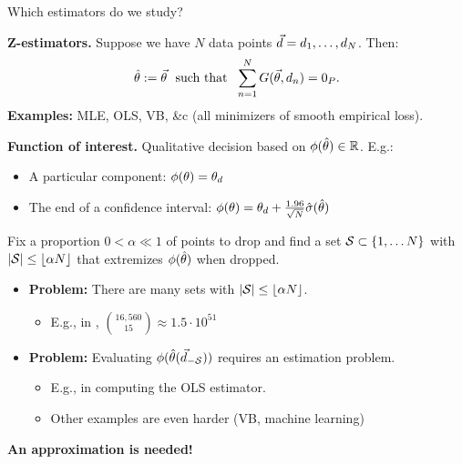 


\begin{frame}[t]{Which estimators do we study?}

\textbf{Z-estimators.  }
Suppose we have $N$ data points $\vec{d} = d_{1}, \ldots, d_{N}$.  Then:
%
\begin{align*}
%
\thetahat :=
\thetavec \,\, \textrm{ such that } \,\,
\sumn
G(\thetavec, \d_{n}) =  \zP .
%
\end{align*}
%
%
\textbf{Examples:} MLE, OLS, VB, \&c (all minimizers of smooth empirical loss).

\hrulefill

\textbf{Function of interest.  }Qualitative decision
based on $\phi(\hat{\theta}) \in \mathbb{R}$.  E.g.:
\begin{itemize}
\item A particular component: $\phi(\theta) = \theta_d$
\item The end of a confidence interval:
    $\phi(\theta) = \theta_d + \frac{1.96}{\sqrt{N}} \hat\sigma(\hat{\theta})$
\end{itemize}

\hrulefill

Fix a proportion $0 < \alpha \ll 1$ of points to drop and
%
find a set $\mathcal{S} \subset \left\{1, \ldots N\right\}$ with $|\mathcal{S}| \le
\lfloor \alpha N \rfloor$ that extremizes $\phi(\hat{\theta})$ when dropped.
%
%
\begin{itemize}
    \item \textbf{Problem: }  There are many sets with $|\mathcal{S}| \le \lfloor \alpha N \rfloor$.
        \begin{itemize}
        \item E.g., in \citet{angelucci2015microcredit},
            ${16,560 \choose 15} \approx 1.5 \cdot 10^{51}$
        \end{itemize}
    \item \textbf{Problem: } Evaluating $\phi(\hat{\theta}(\vec{d}_{-\mathcal{S}}))$
        requires an estimation problem.
        \begin{itemize}
        \item E.g., in \citet{angelucci2015microcredit} computing the OLS
            estimator.
        \item Other examples are even harder (VB, machine learning)
        \end{itemize}
\end{itemize}
%
\textbf{An approximation is needed!}
\end{frame}



